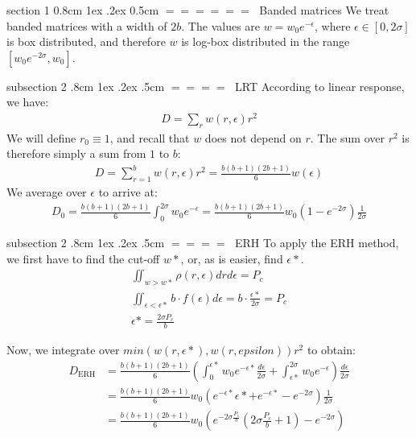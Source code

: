 \documentclass[onecolumn,fleqn,notitlepage,secnumarabic]{revtex4}
\makeatletter
\def\section{%
  \@startsection
    {section}%
    {1}%
    {\z@}%
    {0.8cm \@plus1ex \@minus .2ex}%
    {0.5cm}%
    {\Large\bf $=\!=\!=\!=\!=\!=\;$}%
}%
\def\subsection{%
  \@startsection
    {subsection}%
    {2}%
    {\z@}%
    {.8cm \@plus1ex \@minus .2ex}%
    {.5cm}%
    {\normalfont\small\bfseries$=\!=\!=\!=\;$}%
}%
\makeatother
\begin{document}
\section{Banded matrices} \label{sec:banded}
We treat banded matrices with a width of $2b$. The values 
are $w = w_0e^{-\epsilon}$, where $\epsilon \in [0,2\sigma]$ is box distributed,
and therefore $w$ is log-box distributed in the range $[w_0e^{-2\sigma}, w_0]$.

\subsection{LRT}
According to linear response, we have:
\begin{align}
   D= \sum_r w(r,\epsilon)r^2
\end{align}
We will define $r_0\equiv 1$, and recall that $w$ does not depend on $r$.
The sum over $r^2$ is therefore simply a sum from $1$ to $b$:
\begin{align}
   D= \sum_{r=1}^b w(r,\epsilon) r^2 = \frac{b(b+1)(2b+1)}{6} w(\epsilon)
\end{align}
We average over $\epsilon$ to arrive at:
\begin{align}
   D_0 = \frac{b(b+1)(2b+1)}{6} \int_0^{2\sigma} w_0e^{-\epsilon} = \frac{b(b+1)(2b+1)}{6} w_0\left(1-e^{-2\sigma}\right)\frac{1}{2\sigma}
\end{align}

\subsection{ERH}
To apply the ERH method, we first have to find the cut-off $w*$, or, as is easier, find $\epsilon*$.
\begin{align}
\iint_{w>w*} \rho(r,\epsilon) dr d\epsilon = P_c \\
\iint_{\epsilon<\epsilon*} b\cdot f(\epsilon) d\epsilon = b\cdot\frac{\epsilon*}{2\sigma} = P_c\\
\epsilon* = \frac{2\sigma P_c}{b}
\end{align}

Now, we integrate over $min(w(r,\epsilon*),w(r,epsilon))r^2$ to obtain:
\begin{align}
   D_\textrm{ERH} &= \frac{b(b+1)(2b+1)}{6}(\int_0^{\epsilon*}w_0e^{-\epsilon*}\frac{d\epsilon}{2\sigma} +  \int_{\epsilon*}^{2\sigma} w_0e^{-\epsilon})\frac{d\epsilon}{2\sigma} \\
   &= \frac{b(b+1)(2b+1)}{6} w_0\left(e^{-\epsilon*}\epsilon*+e^{-\epsilon*}-e^{-2\sigma}\right)\frac{1}{2\sigma}\\
   &=\frac{b(b+1)(2b+1)}{6} w_0 \left( e^{-2\sigma\frac{P_c}{b}}\left(2\sigma\frac{P_c}{b} + 1\right) - e^{-2\sigma}\right)
\end{align}
\end{document}
